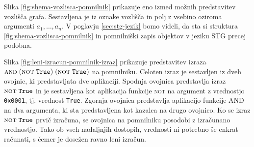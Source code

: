 Slika \ref{fig:shema-vozlisca-pomnilnik} prikazuje eno izmed možnih predstavitev vozlišča grafa. Sestavljena je iz oznake vozlišča in polj z vsebino oziroma argumenti $a_1, \dots, a_n$. V poglavju \ref{sec:stg-jezik} bomo videli, da sta si struktura \ref{fig:shema-vozlisca-pomnilnik} in pomnilniški zapis objektov v jeziku STG precej podobna.

\begin{figure*}[ht]
	\centering
	\caption{Pomnilniška predstavitev vozlišča grafa}
	\label{fig:shema-vozlisca-pomnilnik}
\end{figure*}

Slika \ref{fig:leni-izracun-pomnilnik-izraz} prikazuje predstavitev izraza $\textsc{and} \; (\textsc{not} \; \texttt{True}) \; (\textsc{not} \; \texttt{True})$ na pomnilniku. Celoten izraz je sestavljen iz dveh ovojnic, ki predstavljata dve aplikaciji. Spodnja ovojnica predstavlja izraz $\textsc{not} \; \texttt{True}$ in je sestavljena kot aplikacija funkcije \textsc{not} na argument z vrednostjo \texttt{0x0001}, tj. vrednost \texttt{True}. Zgornja ovojnica predstavlja aplikacijo funkcije \textsc{AND} na dva argumenta, ki sta predstavljena kot kazalca na drugo ovojnico. Ko se izraz $\textsc{not} \; \texttt{True}$ prvič izračuna, se ovojnica na pomnilniku posodobi z iz\-ra\-ču\-na\-no vrednostjo. Tako ob vseh nadaljnjih dostopih, vrednosti ni potrebno še enkrat računati, s čemer je dosežen ravno leni izračun.

